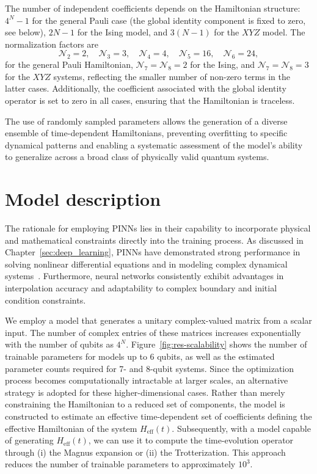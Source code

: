The number of independent coefficients depends on the Hamiltonian structure: $4^N-1$ for the general Pauli case (the global identity component is fixed to zero, see below), $2N-1$ for the Ising model, and $3(N-1)$ for the $XYZ$ model. The normalization factors are
\begin{equation}
\mathcal{N}_2 = 2,\quad \mathcal{N}_3 = 3,\quad \mathcal{N}_4 = 4,\quad \mathcal{N}_5 = 16,\quad \mathcal{N}_6 = 24,
\end{equation}
for the general Pauli Hamiltonian, $\mathcal{N}_7 = \mathcal{N}_8 = 2$ for the Ising, and $\mathcal{N}_7 = \mathcal{N}_8 = 3$ for the $XYZ$ systems, reflecting the smaller number of non-zero terms in the latter cases. Additionally, the coefficient associated with the global identity operator is set to zero in all cases, ensuring that the Hamiltonian is traceless.

The use of randomly sampled parameters allows the generation of a diverse ensemble of time-dependent Hamiltonians, preventing overfitting to specific dynamical patterns and enabling a systematic assessment of the model's ability to generalize across a broad class of physically valid quantum systems.

\section{Model description}
\label{sec:res-model}

The rationale for employing PINNs lies in their capability to incorporate physical and mathematical constraints directly into the training process. As discussed in Chapter~\ref{sec:deep_learning}, PINNs have demonstrated strong performance in solving nonlinear differential equations and in modeling complex dynamical systems~\cite{Raissi2019, karniadakis2021}. Furthermore, neural networks consistently exhibit advantages in interpolation accuracy and adaptability to complex boundary and initial condition constraints.

We employ a model that generates a unitary complex-valued matrix from a scalar input. The number of complex entries of these matrices increases exponentially with the number of qubits as $4^N$. Figure~\ref{fig:res-scalability} shows the number of trainable parameters for models up to 6 qubits, as well as the estimated parameter counts required for 7- and 8-qubit systems. Since the optimization process becomes computationally intractable at larger scales, an alternative strategy is adopted for these higher-dimensional cases. Rather than merely constraining the Hamiltonian to a reduced set of components, the model is constructed to estimate an effective time-dependent set of coefficients defining the effective Hamiltonian of the system $H_{\mathrm{eff}}(t)$. Subsequently, with a model capable of generating $H_{\mathrm{eff}}(t)$, we can use it to compute the time-evolution operator through (i) the Magnus expansion or (ii) the Trotterization. This approach reduces the number of trainable parameters to approximately $10^3$.

